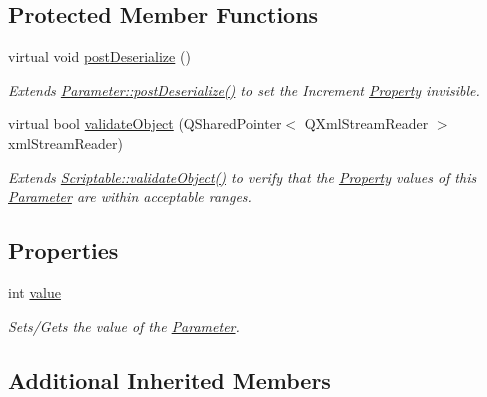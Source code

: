 \subsection*{Protected Member Functions}
\begin{DoxyCompactItemize}
\item 
virtual void \hyperlink{class_picto_1_1_range_parameter_a8ff94bb77dd0cd5a807f63ea2b71bfa0}{post\-Deserialize} ()
\begin{DoxyCompactList}\small\item\em Extends \hyperlink{class_picto_1_1_parameter_aacf1829d9c0e0dc44a7854412f3face6}{Parameter\-::post\-Deserialize()} to set the Increment \hyperlink{class_picto_1_1_property}{Property} invisible. \end{DoxyCompactList}\item 
virtual bool \hyperlink{class_picto_1_1_range_parameter_a1b1ffb07ce7cd71a2a37b56196d9b10d}{validate\-Object} (Q\-Shared\-Pointer$<$ Q\-Xml\-Stream\-Reader $>$ xml\-Stream\-Reader)
\begin{DoxyCompactList}\small\item\em Extends \hyperlink{class_picto_1_1_scriptable_ab6e2944c43a3b5d418bf7b251594386d}{Scriptable\-::validate\-Object()} to verify that the \hyperlink{class_picto_1_1_property}{Property} values of this \hyperlink{class_picto_1_1_parameter}{Parameter} are within acceptable ranges. \end{DoxyCompactList}\end{DoxyCompactItemize}
\subsection*{Properties}
\begin{DoxyCompactItemize}
\item 
\hypertarget{class_picto_1_1_range_parameter_a0b479922c51db48d73e0b6c8ad92f5f8}{int \hyperlink{class_picto_1_1_range_parameter_a0b479922c51db48d73e0b6c8ad92f5f8}{value}}\label{class_picto_1_1_range_parameter_a0b479922c51db48d73e0b6c8ad92f5f8}

\begin{DoxyCompactList}\small\item\em Sets/\-Gets the value of the \hyperlink{class_picto_1_1_parameter}{Parameter}. \end{DoxyCompactList}\end{DoxyCompactItemize}
\subsection*{Additional Inherited Members}


